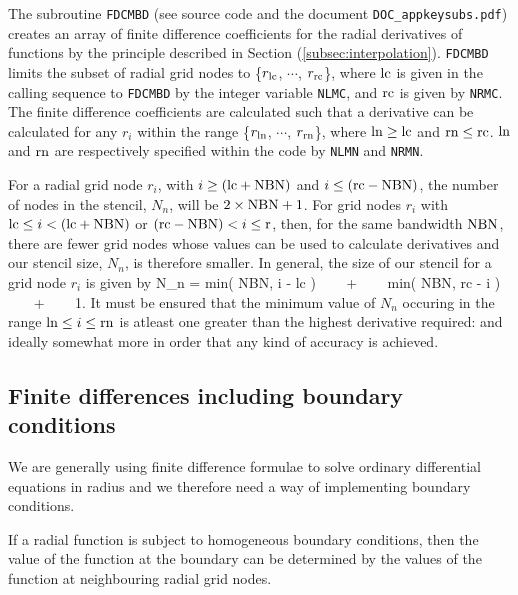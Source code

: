 The subroutine \verb+FDCMBD+ (see source code and the document 
\verb+DOC_appkeysubs.pdf+) creates an array
of finite difference coefficients for the radial derivatives
of functions by the principle described in
Section (\ref{subsec:interpolation}).
\verb+FDCMBD+ limits the subset of radial
grid nodes to
\{$r_{\rm lc}$,  $\cdots$, $r_{\rm rc}$\},
where ${\rm lc}$ is given in the calling sequence
to \verb+FDCMBD+ by the integer variable
\verb+NLMC+, and ${\rm rc}$ is given by \verb+NRMC+.
The finite difference coefficients are calculated
such that a derivative can be calculated for any
$r_i$ within the range
\{$r_{\rm ln}$,  $\cdots$, $r_{\rm rn}$\},
where ${\rm ln} \geq {\rm lc}$ and ${\rm rn} \leq {\rm rc}$.
${\rm ln}$ and ${\rm rn}$ are respectively specified
within the code by \verb+NLMN+ and \verb+NRMN+.

For a radial grid node $r_i$, with
$i \geq ({\rm lc} + {\rm NBN})$ and
$i \leq ({\rm rc} - {\rm NBN})$, the number of nodes
in the stencil, $N_n$, will be 
$2 \times {\rm NBN} + 1$.
For grid nodes $r_i$ with
${\rm lc} \leq i < ({\rm lc} + {\rm NBN})$
or $({\rm rc} - {\rm NBN}) < i \leq {\rm r}$,
then, for the same bandwidth ${\rm NBN}$, there
are fewer grid nodes whose values can be used to
calculate derivatives and our stencil size, $N_n$,
is therefore smaller.
In general, the size of our stencil for a grid node
$r_i$ is given by
\beq
N_n = {\rm min}( {\rm NBN}, i - {\rm lc }) ~~~ + ~~~
      {\rm min}( {\rm NBN}, {\rm rc } - i ) ~~~ + ~~~ 1.
\eeq
It must be ensured that the minimum value of
$N_n$ occuring in the range
${\rm ln} \leq i \leq {\rm rn}$ is atleast
one greater than the highest derivative required:
and ideally somewhat more in order that any
kind of accuracy is achieved.

\subsection{Finite differences including boundary conditions}
\label{subsec:boundaryfinitediffform}

We are generally using finite difference formulae to
solve ordinary differential equations in radius and
we therefore need a way of implementing boundary conditions.

If a radial function is subject to homogeneous boundary
conditions, then the value of the function at the boundary
can be determined by the values of the function at
neighbouring radial grid nodes.

